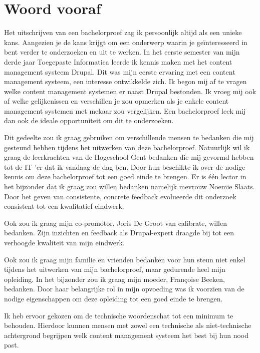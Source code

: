 
\chapter*{Woord vooraf}
\label{ch:voorwoord}


Het uitschrijven van een bachelorproef zag ik persoonlijk altijd als een unieke kans. Aangezien je de kans krijgt om een onderwerp waarin je geïnteresseerd in bent verder te onderzoeken en uit te werken. In het eerste semester van mijn derde jaar Toegepaste Informatica leerde ik kennis maken met het content management systeem Drupal. Dit was mijn eerste ervaring met een content management systeem, een interesse ontwikkelde zich. Ik begon mij af te vragen welke content management systemen er naast Drupal bestonden. Ik vroeg mij ook af welke gelijkenissen en verschillen je zou opmerken als je enkele content management systemen met mekaar zou vergelijken. Een bachelorproef leek mij dan ook de ideale opportuniteit om dit te onderzoeken.

Dit gedeelte zou ik graag gebruiken om verschillende mensen te bedanken die mij gesteund hebben tijdens het uitwerken van deze bachelorproef. Natuurlijk wil ik graag de leerkrachten van de Hogeschool Gent bedanken die mij gevormd hebben tot de IT 'er dat ik vandaag de dag ben. Door hun beschikte ik over de nodige kennis om deze bachelorproef tot een goed einde te brengen. Er is één lector in het bijzonder dat ik graag zou willen bedanken namelijk mevrouw Noemie Slaats. Door het geven van consistente, concrete feedback evolueerde dit onderzoek consistent tot een kwalitatief eindwerk.

Ook zou ik graag mijn co-promotor, Joris De Groot van calibrate, willen bedanken. Zijn inzichten en feedback als Drupal-expert draagde bij tot een verhoogde kwaliteit van mijn eindwerk.

Ook zou ik graag mijn familie en vrienden bedanken voor hun steun niet enkel tijdens het uitwerken van mijn bachelorproef, maar gedurende heel mijn opleiding. In het bijzonder zou ik graag mijn moeder, Françoise Beeken, bedanken. Door haar belangrijke rol in mijn opvoeding was ik voorzien van de nodige eigenschappen om deze opleiding tot een goed einde te brengen.

Ik heb ervoor gekozen om de technische woordenschat tot een minimum te behouden. Hierdoor kunnen mensen met zowel een technische als niet-technische achtergrond begrijpen welk content management systeem het best bij hun nood past.